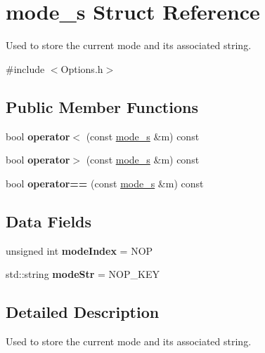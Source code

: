 \hypertarget{structmode__s}{}\section{mode\+\_\+s Struct Reference}
\label{structmode__s}


Used to store the current mode and its associated string.  




{\ttfamily \#include $<$Options.\+h$>$}

\subsection*{Public Member Functions}
\begin{DoxyCompactItemize}
\item 
\mbox{\label{structmode__s_af0b465362e161dfa7bc496d198e50a84}} 
bool {\bfseries operator$<$} (const \mbox{\hyperlink{structmode__s}{mode\+\_\+s}} \&m) const
\item 
\mbox{\label{structmode__s_a21c3616df921f120ae58af0a3458eb8d}} 
bool {\bfseries operator$>$} (const \mbox{\hyperlink{structmode__s}{mode\+\_\+s}} \&m) const
\item 
\mbox{\label{structmode__s_ac276a3c53be1431ff38563bcceab934c}} 
bool {\bfseries operator==} (const \mbox{\hyperlink{structmode__s}{mode\+\_\+s}} \&m) const
\end{DoxyCompactItemize}
\subsection*{Data Fields}
\begin{DoxyCompactItemize}
\item 
\mbox{\label{structmode__s_a0697deee2e5a1f31088457915929c5f4}} 
unsigned int {\bfseries mode\+Index} = N\+OP
\item 
\mbox{\label{structmode__s_acefeb36913d7b40209d1bb56a562f845}} 
std\+::string {\bfseries mode\+Str} = N\+O\+P\+\_\+\+K\+EY
\end{DoxyCompactItemize}


\subsection{Detailed Description}
Used to store the current mode and its associated string. 

